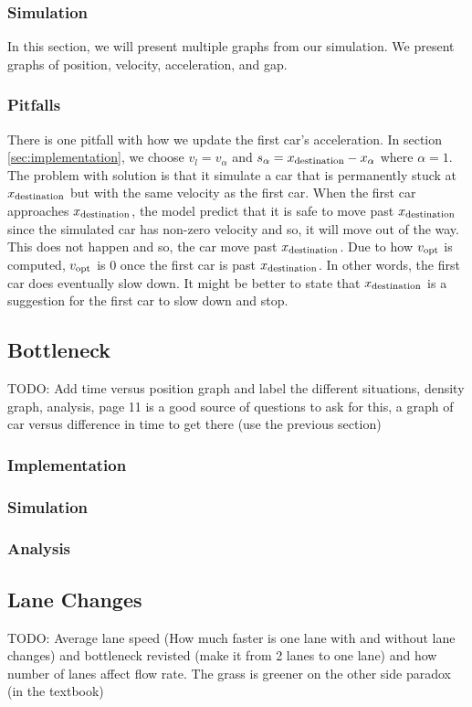 \documentclass[12pt]{article}
\begin{document}
    \subsubsection{Simulation}
    In this section, we will present multiple graphs from our simulation. We present graphs of position, velocity, acceleration, and gap. 
    \subsubsection{Pitfalls}
    There is one pitfall with how we update the first car's acceleration. In section \ref{sec:implementation}, we choose $v_l = v_\alpha$ and $s_\alpha = x_{\rm destination} - x_\alpha$ where $\alpha = 1$. The problem with solution is that it simulate a car that is permanently stuck at $x_{\rm destination}$ but with the same velocity as the first car. When the first car approaches $x_{\rm destination}$, the model predict that it is safe to move past $x_{\rm destination}$ since the simulated car has non-zero velocity and so, it will move out of the way. This does not happen and so, the car move past $x_{\rm destination}$. Due to how $v_{\rm opt}$ is computed, $v_{\rm opt}$ is $0$ once the first car is past $x_{\rm destination}$. In other words, the first car does eventually slow down. It might be better to state that $x_{\rm destination}$ is a suggestion for the first car to slow down and stop. 
    \subsection{Bottleneck}
    TODO: Add time versus position graph and label the different situations, density graph, analysis, page 11 is a good source of questions to ask for this, a graph of car versus difference in time to get there (use the previous section)
    \subsubsection{Implementation}
    \subsubsection{Simulation}
    \subsubsection{Analysis}
    \subsection{Lane Changes}
    TODO: Average lane speed (How much faster is one lane with and without lane changes) and bottleneck revisted (make it from 2 lanes to one lane) and how number of lanes affect flow rate. The grass is greener on the other side paradox (in the textbook) 
\end{document}

